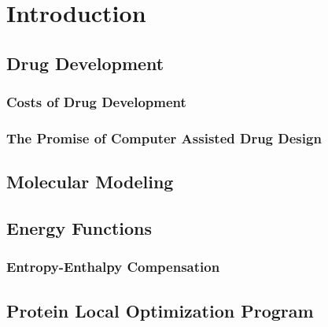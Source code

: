 \chapter{Introduction}
\label{chapter:intro}

\section{Drug Development}
\label{section:drug_development}

\subsection{Costs of Drug Development}
\label{subsection:costs_of_drug_development}


\subsection{The Promise of Computer Assisted Drug Design}
\label{subsection:computer_assisted_drug_design}

\section{Molecular Modeling}
\label{section:molecular_modeling}

\section{Energy Functions}
\label{section:energy_functions}

\subsection{Entropy-Enthalpy Compensation}
\label{subsection:entropy_enthalpy}

\section{Protein Local Optimization Program}
\label{section:protein_local_optimization_program}
